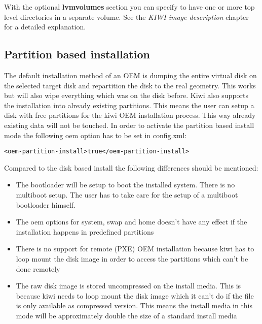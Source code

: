With the optional \textbf{lvmvolumes} section you can specify to have 
one or more top level directories in a separate volume. See the
\textit{KIWI image description} chapter for a detailed explanation.

\subsection{Partition based installation}

The default installation method of an OEM is dumping the entire
virtual disk on the selected target disk and repartition the disk
to the real geometry. This works but will also wipe everything which
was on the disk before. Kiwi also supports the installation into
already existing partitions. This means the user can setup a disk
with free partitions for the kiwi OEM installation process. This
way already existing data will not be touched. In order to activate
the partition based install mode the following oem option has to
be set in config.xml:

\begin{Command}{14cm}
\begin{verbatim}
<oem-partition-install>true</oem-partition-install>
\end{verbatim}
\end{Command}

Compared to the disk based install the following differences
should be mentioned:

\begin{itemize}
\item The bootloader will be setup to boot the installed system. There
      is no multiboot setup. The user has to take care for the setup
      of a multiboot bootloader himself.
\item The oem options for system, swap and home doesn't have any effect
      if the installation happens in predefined partitions
\item There is no support for remote (PXE) OEM installation because kiwi
      has to loop mount the disk image in order to access the partitions
      which can't be done remotely
\item The raw disk image is stored uncompressed on the install media.
      This is because kiwi needs to loop mount the disk image which it can't
      do if the file is only available as compressed version. This means
      the install media in this mode will be approximately double the size
      of a standard install media
\end{itemize}

